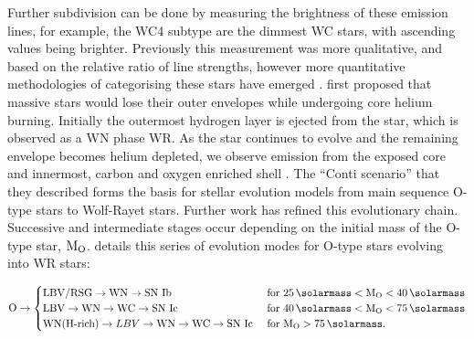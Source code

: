 \noindent
Further subdivision can be done by measuring the brightness of these emission lines, for example, the WC4 subtype are the dimmest WC stars, with ascending values being brighter.
Previously this measurement was more qualitative, and based on the relative ratio of line strengths, however more quantitative methodologies of categorising these stars have emerged
\parencite{crowtherQuantitativeClassificationWC1998}.
\textcite{contiRelationshipWRStars1975} first proposed that massive stars would lose their outer envelopes while undergoing core helium burning.
Initially the outermost hydrogen layer is ejected from the star, which is observed as a WN phase WR.
As the star continues to evolve and the remaining envelope becomes helium depleted, we observe emission from the exposed core and innermost, carbon and oxygen enriched shell
\parencite{neugentWolfRayetContent2019,oswaltPlanetsStarsStellar2013}.
The ``Conti scenario'' that they described forms the basis for stellar evolution models from main sequence O-type stars to Wolf-Rayet stars.
Further work has refined this evolutionary chain.
Successive and intermediate stages occur depending on the initial mass of the O-type star, $\text{M}_\text{O}$.
\textcite{crowther_physical_2007} details this series of evolution modes for O-type stars evolving into WR stars:

\begin{equation}
  \label{eq:wrevolution}
  \text{O} \rightarrow
  \begin{cases}
    \text{LBV/RSG} \rightarrow \text{WN} \rightarrow \text{SN Ib} & \text{ for } \SI{25}{\solarmass} < \mass\rms{O} < \SI{40}{\solarmass} \\
    \text{LBV} \rightarrow \text{WN} \rightarrow \text{WC} \rightarrow \text{SN Ic} & \text{ for } \SI{40}{\solarmass} < \mass\rms{O} < \SI{75}{\solarmass} \\ 
    \text{WN(H-rich)} \rightarrow LBV \rightarrow \text{WN} \rightarrow \text{WC} \rightarrow \text{SN Ic} & \text{ for } \mass\rms{O} > \SI{75}{\solarmass} .
  \end{cases}
\end{equation}

